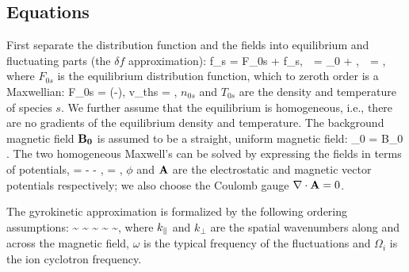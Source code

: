     \subsection{Equations}
    First separate the distribution function and the fields into equilibrium and
    fluctuating parts (the $\delta f$ approximation):
    \beq
        f_s = F_{0s} + \delta f_s, \,\,  = _0 + \delta{}, \,\,  =
        \delta {},
    \eeq
    where $F_{0s}$ is the equilibrium distribution function, which to zeroth order is a
    Maxwellian:
    \beq
      F_{0s} =  \exp
      \lt(-\rt), \quad v_{ths} = ,
    \eeq
    $n_{0s}$ and $T_{0s}$ are the density and temperature of species $s$. We further
    assume that the equilibrium is homogeneous, i.e., there are no gradients of the
    equilibrium density and temperature. The background magnetic field $\mathbf{B_0}$ is 
    assumed to be a straight, uniform magnetic field:
    \beq
        _0 = B_0 .
    \eeq
    The two homogeneous Maxwell's
     can be solved by expressing the fields in terms
    of potentials,
    \beq
        \delta {} = - \nabla \phi - , \quad \delta {} = \nabla \times
        ,
    \eeq
    $\phi$ and $\mathbf{A}$ are the electrostatic and magnetic vector potentials respectively;
    we also choose the Coulomb gauge $\nabla \cdot \mathbf{A} = 0$.
    
    The gyrokinetic approximation is formalized by the following ordering
    assumptions:
    \beq
         \sim {} \sim {} \sim {} \sim {} \sim \epsilon {},
    \eeq
    where $k_\parallel$ and $k_\perp$ are the spatial wavenumbers along and across the magnetic
    field, $\omega$ is the typical frequency of the fluctuations and $\Omega_i$ is the ion
    cyclotron frequency.


